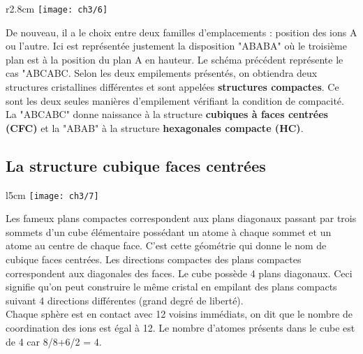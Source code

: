 			\begin{wrapfigure}[4]{r}{2.8cm}
			\vspace{-8mm}
			\texttt{[image: ch3/6]}
			\end{wrapfigure}
			De nouveau, il a le choix entre deux familles d'emplacements : position des ions A ou l'autre. Ici est représentée justement la disposition "ABABA" où le troisième plan est à la position du plan A en hauteur. Le schéma précédent représente le cas "ABCABC. Selon les deux empilements présentés, on obtiendra deux structures cristallines différentes et sont appelées \textbf{structures compactes}. Ce sont les deux seules manières d'empilement vérifiant la condition de compacité.
			La "ABCABC" donne naissance à la structure \textbf{cubiques à faces centrées (CFC)} et la "ABAB" à la structure \textbf{hexagonales compacte (HC)}.
			
		\subsection{La structure cubique faces centrées}
			\begin{wrapfigure}[5]{l}{5cm}
			\vspace{-5mm}
			\texttt{[image: ch3/7]}
			\end{wrapfigure}
			Les fameux plans compactes correspondent aux plans diagonaux passant par trois sommets d'un cube élémentaire possédant un atome à chaque sommet et un atome au centre de chaque face. C'est cette géométrie qui donne le nom de cubique faces centrées. Les directions compactes des plans compactes correspondent aux diagonales des faces. Le cube possède 4 plans diagonaux. Ceci signifie qu'on peut construire le même cristal en empilant des plans compacts suivant 4 directions différentes (grand degré de liberté). \\
			Chaque sphère est en contact avec 12 voisins immédiats, on dit que le nombre de coordination des ions est égal à 12. Le nombre d'atomes présents dans le cube est de 4 car 8/8+6/2 = 4.\\
			
